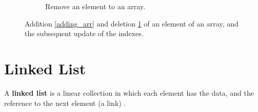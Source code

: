 \begin{figure}[H]
\begin{subfigure}[b]{\linewidth}
\caption{Remove an element to an array.}
\label{removing_arr}
\end{subfigure}
\caption[Addition \ref{adding_arr} and deletion \ref{removing_arr} of an element of an array, and the subsequent update of the indexes.]{Addition \ref{adding_arr} and deletion \ref{removing_arr} of an element of an array, and the subsequent update of the indexes.}
\label{array_2}
\end{figure}

\section{Linked List}
\label{linkedlist}
A \textbf{linked list} is a linear collection in which each element has the data, and the reference to the next element (a link) \cite{wikilinkedlist}. 


